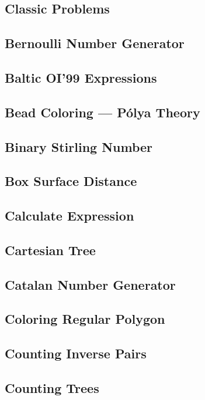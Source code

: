 \documentclass{report}
\begin{document}
\begin{CJK*}{GBK}{kai}
\chapter{Classic Problems}
\section{Bernoulli Number Generator}

\clearpage
\section{Baltic OI'99 Expressions}

\section{Bead Coloring --- P\'olya Theory}

\clearpage
\section{Binary Stirling Number}

\section{Box Surface Distance}

\section{Calculate Expression}

\section{Cartesian Tree}

\clearpage
\section{Catalan Number Generator}

\clearpage
\section{Coloring Regular Polygon}

\section{Counting Inverse Pairs}

\section{Counting Trees}


\end{CJK*}
\end{document}

